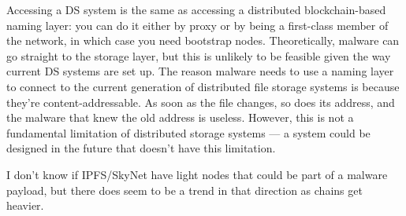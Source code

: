 Accessing a DS system is the same as accessing a distributed 
blockchain-based naming layer: you can do it either by proxy 
or by being a first-class member of the network, in which 
case you need bootstrap nodes. Theoretically, malware can go 
straight to the storage layer, but this is unlikely to be 
feasible given the way current DS systems are set up. The 
reason malware needs 
to use a naming layer to connect to the current generation of 
distributed file storage systems is because they're 
content-addressable. As soon as the file changes, so 
does its address, and the malware that knew the old address 
is useless. 
However, this is not a fundamental limitation of distributed 
storage systems --- a system could be designed in the future 
that doesn't have this limitation.

I don't know if IPFS/SkyNet have light nodes that could be 
part of a malware payload, but there does seem to be a trend 
in that direction as chains get heavier.
